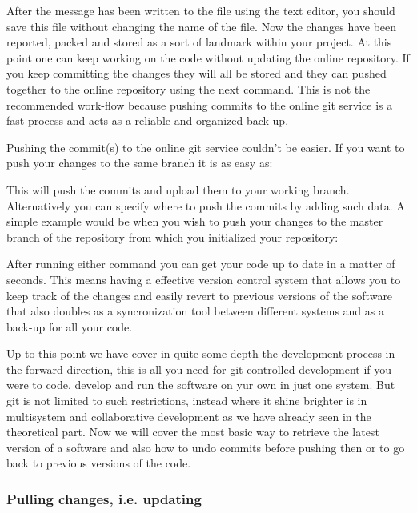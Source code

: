 \documentclass[runningheads,a4paper]{llncs}
\begin{document}
After the message has been written to the file using the text editor, you should save this file without changing the name of the file. Now the changes have been reported, packed and stored as a sort of landmark within your project. At this point one can keep working on the code without updating the online repository. If you keep committing the changes they will all be stored and they can pushed together to the online repository using the next command. This is not the recommended work-flow because pushing commits to the online git service is a fast process and acts as a reliable and organized back-up.

Pushing the commit(s) to the online git service couldn't be easier. If you want to push your changes to the same branch it is as easy as:\newline

\newline

This will push the commits and upload them to your working branch. Alternatively you can specify where to push the commits by adding such data. A simple example would be when you wish to push your changes to the master branch of the repository from which you initialized your repository: \newline

\newline

After running either command you can get your code up to date in a matter of seconds. This means having a effective version control system that allows you to keep track of the changes and easily revert to previous versions of the software that also doubles as a syncronization tool between different systems and as a back-up for all your code.

Up to this point we have cover in quite some depth the development process in the forward direction, this is all you need for git-controlled development if you were to code, develop and run the software on yur own in just one system. But git is not limited to such restrictions, instead where it shine brighter is in multisystem and collaborative development as we have already seen in the theoretical part. Now we will cover the most basic way to retrieve the latest version of a software and also how to undo commits before pushing then or to go back to previous versions of the code. 

\subsubsection{Pulling changes, i.e. updating\newline} 
\end{document}
